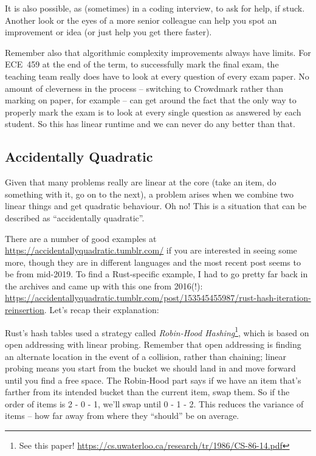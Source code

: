 It is also possible, as (sometimes) in a coding interview, to ask for help, if stuck. Another look or the eyes of a more senior colleague can help you spot an improvement or idea (or just help you get there faster). 

Remember also that algorithmic complexity improvements always have limits. For ECE~459 at the end of the term, to successfully mark the final exam, the teaching team really does have to look at every question of every exam paper. No amount of cleverness in the process -- switching to Crowdmark rather than marking on paper, for example -- can get around the fact that the only way to properly mark the exam is to look at every single question as answered by each student. So this has linear runtime and we can never do any better than that. 

\subsection*{Accidentally Quadratic}
Given that many problems really are linear at the core (take an item, do something with it, go on to the next), a problem arises when we combine two linear things and get quadratic behaviour. Oh no! This is a situation that can be described as ``accidentally quadratic''.

There are a number of good examples at \url{https://accidentallyquadratic.tumblr.com/} if you are interested in seeing some more, though they are in different languages and the most recent post seems to be from mid-2019. To find a Rust-specific example, I had to go pretty far back in the archives and came up with this one from 2016(!): \url{https://accidentallyquadratic.tumblr.com/post/153545455987/rust-hash-iteration-reinsertion}. Let's recap their explanation:

Rust's hash tables used a strategy called \textit{Robin-Hood Hashing}\footnote{See this paper! \url{https://cs.uwaterloo.ca/research/tr/1986/CS-86-14.pdf}}, which is based on open addressing with linear probing. Remember that open addressing is finding an alternate location in the event of a collision, rather than chaining; linear probing means you start from the bucket we should land in and move forward until you find a free space. The Robin-Hood part says if we have an item that's farther from its intended bucket than the current item, swap them. So if the order of items is 2 - 0 - 1, we'll swap until 0 - 1 - 2. This reduces the variance of items -- how far away from where they ``should'' be on average.

